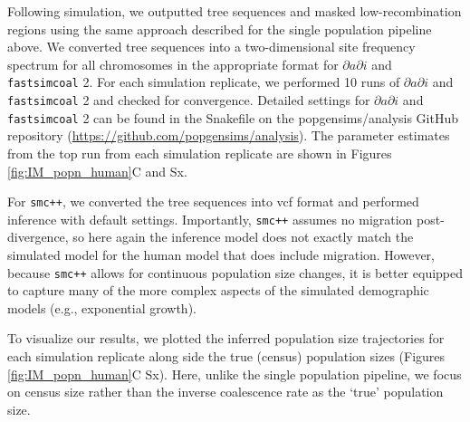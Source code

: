 \documentclass[12pt,halfline,a4paper]{ouparticle}
\newcommand{\dadi}{$\partial a \partial i$\xspace}
\newcommand{\smcpp}{\texttt{smc++}\xspace}
\newcommand{\fastsimcoal}{\texttt{fastsimcoal}\xspace}
\begin{document}
Following simulation, we outputted tree sequences and masked low-recombination
regions using the same approach described for the single population pipeline above. We
converted tree sequences into a two-dimensional site frequency spectrum for all
chromosomes in the appropriate format for \dadi and \fastsimcoal2. For each simulation
replicate, we performed 10 runs of \dadi and \fastsimcoal2 and checked for convergence.
Detailed settings for \dadi and \fastsimcoal2 can be found in the Snakefile
on the popgensims/analysis GitHub repository (\url{https://github.com/popgensims/analysis}).
The parameter estimates from the top run from each simulation replicate
are shown in Figures \ref{fig:IM_popn_human}C and Sx.

For \smcpp , we converted the tree sequences into vcf format and performed inference
with default settings. Importantly, \smcpp assumes no migration post-divergence, so
here again the inference model does not exactly match the simulated model for the
human model that does include migration. However, because \smcpp allows
for continuous population size changes, it is better equipped to capture many of the
more complex aspects of the simulated demographic models (e.g., exponential growth).

To visualize our results, we plotted the inferred population size trajectories
for each simulation replicate along side the true (census) population sizes
(Figures \ref{fig:IM_popn_human}C Sx). Here, unlike the single population pipeline,
we focus on census size rather than the inverse coalescence rate as the `true' population size.
\end{document}
